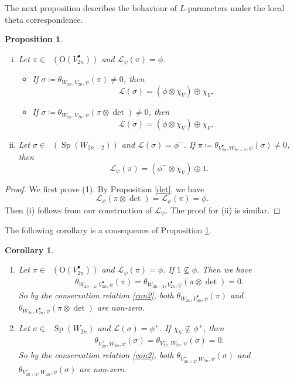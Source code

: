 \documentclass[article]{article}
\numberwithin{equation}{section}
\newtheorem{corollary}[theorem]{Corollary}
\newtheorem{proposition}[theorem]{Proposition}
\theoremstyle{definition}
\DeclareMathOperator{\SP}{Sp}
\DeclareMathOperator{\Irrt}{Irr_{temp}}
\begin{document}
The next proposition describes the behaviour of $L$-parameters under the local theta correspondence. 
\begin{proposition}\label{prasad} 
\begin{enumerate}[(i)]
	\item Let $\pi \in \Irrt \left( \mathrm O(V^\bullet_{2n})\right)$ and $\mathcal L_{\psi}(\pi)=\phi$. 
	\begin{itemize}
		\item If $\sigma\coloneqq\theta_{W_{2n}, V_{2n},  \psi}(\pi)\neq 0$, then 
		$$\mathcal L(\sigma)=(\phi\otimes \chi_V)\oplus \chi_{V}.$$
		\item If $\sigma\coloneqq\theta_{W_{2n}, V_{2n},  \psi}(\pi\otimes\det )\neq 0$, then 
		$$\mathcal L(\sigma)=(\phi\otimes \chi_V)\oplus \chi_{V}.$$
	\end{itemize}
	\item Let $\sigma\in \Irrt \left( \SP(W_{2n-2})\right)$ and $\mathcal L(\sigma)=\phi^-$. If $\pi\coloneqq\theta_{V^\bullet_{2n},W_{2n-2},\psi}(\sigma)\neq 0$, then  $$\mathcal L_{\psi}(\pi)=(\phi^-\otimes\chi_{V})\oplus \mathrm{1}.$$
\end{enumerate}
\end{proposition}
\begin{proof}
We first prove (1). By Proposition \ref{det}, we have 
$$\mathcal L_{\psi}(\pi\otimes\det)=\mathcal L_\psi(\pi)=\phi.$$ Then (i) follows from our construction of $\mathcal L_{\psi}$. The proof for (ii) is similar.
\end{proof}

The following corollary is a consequence of Proposition \ref{prasad}.  
\begin{corollary}\label{1inphi}
	\begin{enumerate}[(1)]
		\item Let $\pi \in \Irrt \left(\mathrm O(V^\bullet_{2n})\right)$ and $\mathcal L_{\psi}(\pi)=\phi$. If $\mathrm{1} \nsubseteq \phi$. Then we have  
		\begin{align*}
			\theta_{W_{2n-2}, V_{2n}^{\bullet} ,\psi}(\pi)= \theta_{W_{2n-2}, V_{2n}^{\bullet} ,\psi}(\pi\otimes\det)=0.
		\end{align*}
			So by the conservation relation \ref{con2}, both $\theta_{W_{2n}, V_{2n}^{\bullet},\psi}(\pi)$ and $\theta_{W_{2n}, V_{2n}^{\bullet}, \psi}(\pi\otimes \det)$ are non-zero. 
	\item Let $\sigma\in \Irrt \SP(W_{2n})$ and $\mathcal L(\sigma)=\phi^+$. If $\chi_{V}\nsubseteq \phi^+$, then
		\begin{align*}
	\theta_{V^{+}_{2n},W_{2n},\psi}(\sigma)=\theta_{V^{-}_{2n},W_{2n},\psi}(\sigma)=0.
	\end{align*}
	So by the conservation relation \ref{con2}, both $\theta_{V^{+}_{2n+2},W_{2n},\psi}(\sigma)$ and $\theta_{V^{-}_{2n+2},W_{2n},\psi}(\sigma)$ are non-zero. 
	\end{enumerate}
\end{corollary}
\end{document}

